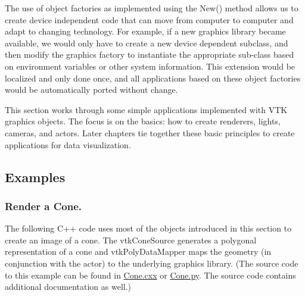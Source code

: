 The use of object factories as implemented using the New() method allows us to create device independent code that can move from computer to computer and adapt to changing technology. For example, if a new graphics library became available, we would only have to create a new device dependent subclass, and then modify the graphics factory to instantiate the appropriate sub-class based on environment variables or other system information. This extension would be localized and only done once, and all applications based on these object factories would be automatically ported without change.

This section works through some simple applications implemented with VTK graphics objects. The focus is on the basics: how to create renderers, lights, cameras, and actors. Later chapters tie together these basic principles to create applications for data visualization.

\subsection{Examples}
\subsubsection{Render a Cone.}

The following C++ code uses most of the objects introduced in this section to create an image of a cone. The vtkConeSource generates a polygonal representation of a cone and vtkPolyDataMapper maps the geometry (in conjunction with the actor) to the underlying graphics library. (The source code to this example can be found in \href{https://lorensen.github.io/VTKExamples/site/Cxx/GeometricObjects/Cone/}{Cone.cxx} or \href{https://lorensen.github.io/VTKExamples/site/Python/GeometricObjects/Cone/}{Cone.py}. The source code contains additional documentation as well.)

